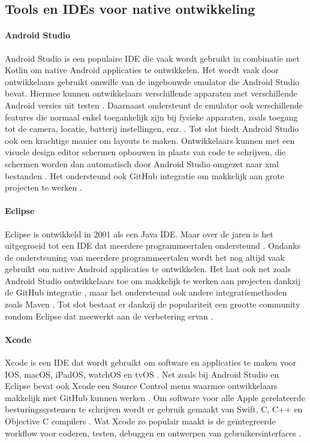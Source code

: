 \subsection{Tools en IDEs voor native ontwikkeling}

\paragraph{Android Studio}
Android Studio is een populaire IDE die vaak wordt gebruikt in combinatie met 
Kotlin om native Android applicaties te ontwikkelen. Het wordt vaak door ontwikkelaars 
gebruikt omwille van de ingebouwde \gls{emulator} die Android Studio bevat. Hiermee 
kunnen ontwikkelaars verschillende apparaten met verschillende Android versies uit 
testen \autocite{Medewar2022}. Daarnaast ondersteunt de emulator ook verschillende 
features die normaal enkel toegankelijk zijn bij fysieke apparaten, zoals toegang tot 
de camera, locatie, batterij instellingen, enz. \autocite{Okeke2022}. Tot slot biedt 
Android Studio ook een krachtige manier om layouts te maken. Ontwikkelaars kunnen met 
een visuele design editor schermen opbouwen in plaats van code te schrijven, die schermen 
worden dan automatisch door Android Studio omgezet naar xml bestanden \autocite{Medewar2022}. 
Het ondersteund ook GitHub integratie om makkelijk aan grote projecten te werken \autocite{Studio2023}.

\paragraph{Eclipse}
Eclipse is ontwikkeld in 2001 als een Java IDE. Maar over de jaren is het uitgegroeid 
tot een IDE dat meerdere programmeertalen ondersteund \autocite{Medewar2022}. Ondanks 
de ondersteuning van meerdere programmeertalen wordt het nog altijd vaak gebruikt om native 
Android applicaties te ontwikkelen. Het laat ook net zoals Android Studio ontwikkelaars toe 
om makkelijk te werken aan projecten dankzij de GitHub integratie \autocite{Okeke2022}, maar 
het ondersteund ook andere integratiemethoden zoals Maven \autocite{Medewar2022}. Tot slot 
bestaat er dankzij de populariteit een grootte community rondom Eclipse dat meewerkt aan de 
verbetering ervan \autocite{Medewar2022}.

\paragraph{Xcode}
Xcode is een IDE dat wordt gebruikt om software en applicaties te maken voor IOS, macOS, 
iPadOS, watchOS en tvOS \autocite{jahnavisarora2020}. Net zoals bij Android Studio en 
Eclipse bevat ook Xcode een Source Control menu waarmee ontwikkelaars makkelijk met GitHub 
kunnen werken \autocite{Medewar2022}. Om software voor alle Apple gerelateerde besturingssystemen 
te schrijven wordt er gebruik gemaakt van Swift, C, C++ en Objective C compilers 
\autocite{jahnavisarora2020}. Wat Xcode zo populair maakt is de geïntegreerde workflow 
voor coderen, testen, debuggen en ontwerpen van gebruikersinterfaces \autocite{jahnavisarora2020}.

